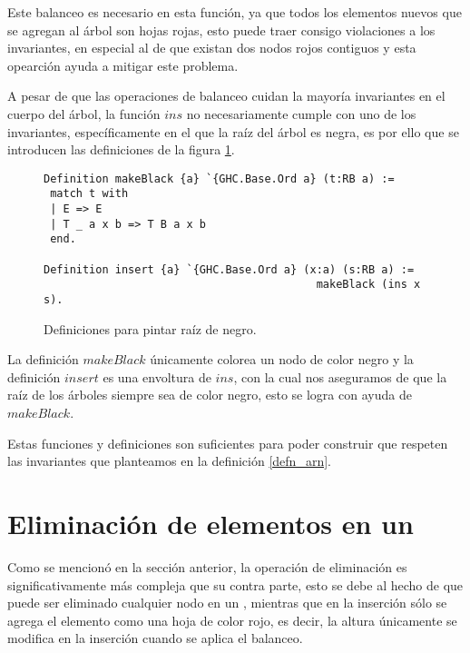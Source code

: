 Este balanceo es necesario en esta funci\'on, ya que todos los elementos nuevos que se agregan al 
\'arbol son hojas rojas, esto puede traer consigo violaciones a los invariantes, en especial al de
que existan dos nodos rojos contiguos y esta opearci\'on ayuda a mitigar este problema.

A pesar de que las operaciones de balanceo cuidan la mayoría invariantes en el cuerpo del \'arbol,
la función \hyperref[func_ins]{$ins$} no necesariamente cumple con uno de los invariantes, 
espec\'ificamente en el que la raíz del árbol es negra, es por ello que se introducen las 
definiciones de la figura 
\ref{raiz_negra_func}.

\begin{figure}[!ht]
\centering
\captionsetup{justification=centering}
\begin{verbatim}
Definition makeBlack {a} `{GHC.Base.Ord a} (t:RB a) :=
 match t with
 | E => E
 | T _ a x b => T B a x b
 end.

Definition insert {a} `{GHC.Base.Ord a} (x:a) (s:RB a) :=
                                          makeBlack (ins x s).
\end{verbatim}
\caption{Definiciones para pintar ra\'iz de negro.}
\label{raiz_negra_func}
\end{figure}

La definici\'on \hyperref[raiz_negra_func]{$makeBlack$} únicamente colorea un nodo de color negro y 
la definición \hyperref[raiz_negra_func]{$insert$} es una envoltura de \hyperref[func_ins]{$ins$}, 
con la cual nos aseguramos de que la ra\'iz de los \'arboles siempre sea de color negro, esto se 
logra con ayuda de \hyperref[raiz_negra_func]{$makeBlack$}.

Estas funciones y definiciones son suficientes para poder construir {\arns} que respeten las
invariantes que planteamos en la definici\'on \ref{defn_arn}.

\section{Eliminación de elementos en un {\arn}}

Como se mencion\'o en la secci\'on anterior, la operaci\'on de eliminaci\'on es significativamente 
m\'as compleja que su contra parte, esto se debe al hecho de que puede ser eliminado cualquier 
nodo en un {\arn}, mientras que en la inserci\'on s\'olo se agrega el elemento como una hoja de 
color rojo, es decir, la altura \'unicamente se modifica en la inserción cuando se aplica el 
balanceo.

